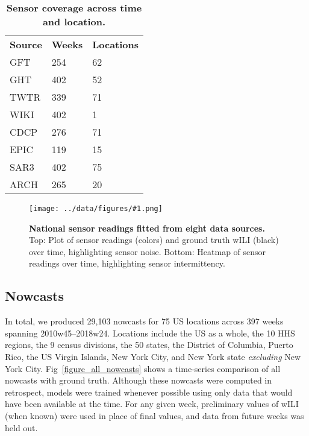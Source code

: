 \documentclass[10pt,letterpaper]{article}
\newlength\savedwidth
\newcommand\thickhline{\noalign{\global\savedwidth\arrayrulewidth\global\arrayrulewidth 2pt}%
\hline
\noalign{\global\arrayrulewidth\savedwidth}}
\newcommand{\maybeincludegraphics}[1]{\texttt{[image: ../data/figures/\#1.png]}}
\begin{document}
\begin{table}[!ht]
  \centering
  \caption{{\bf Sensor coverage across time and location.}}
  \begin{tabular}{|l|l|l|}
    \hline
    {\bf Source} & {\bf Weeks} & {\bf Locations}\\ \thickhline
    GFT & 254 & 62 \\ \hline
    GHT & 402 & 52 \\ \hline
    TWTR & 339 & 71 \\ \hline
    WIKI & 402 & 1 \\ \hline
    CDCP & 276 & 71 \\ \hline
    EPIC & 119 & 15 \\ \hline
    SAR3 & 402 & 75 \\ \hline
    ARCH & 265 & 20 \\ \hline
  \end{tabular}
  \label{table_sensor_breakdown}
\end{table}

\begin{figure}[!ht]
  \maybeincludegraphics{sensor_heatmap}
  \caption{
    {\bf National sensor readings fitted from eight data sources.}
    Top: Plot of sensor readings (colors) and ground truth wILI (black) over
    time, highlighting sensor noise.
    Bottom: Heatmap of sensor readings over time, highlighting sensor
    intermittency.
  }
  \label{figure_sensor_heatmap}
\end{figure}

\subsection*{Nowcasts}


In total, we produced 29,103 nowcasts for 75 US locations across 397 weeks
spanning 2010w45--2018w24. Locations include the US as a whole, the 10 HHS
regions, the 9 census divisions, the 50 states, the District of Columbia,
Puerto Rico, the US Virgin Islands, New York City, and New York state
\textit{excluding} New York City. Fig~\ref{figure_all_nowcasts} shows a
time-series comparison of all nowcasts with ground truth. Although these
nowcasts were computed in retrospect, models were trained whenever possible
using only data that would have been available at the time. For any given week,
preliminary values of wILI (when known) were used in place of final values, and
data from future weeks was held out.
\end{document}
